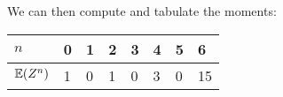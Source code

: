 \documentclass[twocolumn]{article}
\begin{document}
We can then compute and tabulate the moments:
\begin{table}[h]
\centering
\begin{tabular}{@{}llllllll@{}}
\toprule
$n$   & 0 & 1 & 2 & 3 & 4 & 5 & 6  \\ \midrule
$\mathbb{E}(Z^n)$ & 1 & 0 & 1 & 0 & 3 & 0 & 15 \\ \bottomrule
\end{tabular}
\end{table}
\end{document}
